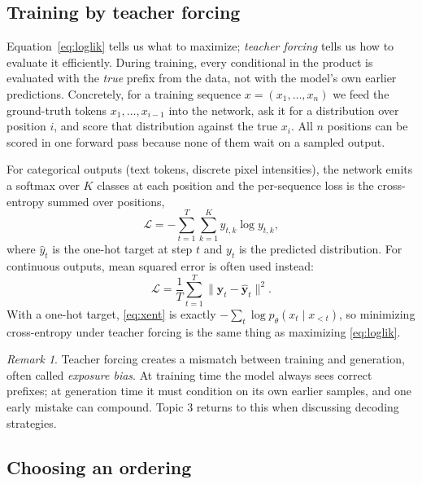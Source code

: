 \documentclass[11pt]{article}
\theoremstyle{remark}
\newtheorem*{remark}{Remark}
\begin{document}
\subsection{Training by teacher forcing}

Equation~\eqref{eq:loglik} tells us what to maximize; \emph{teacher forcing} tells us how to evaluate it efficiently. During training, every conditional in the product is evaluated with the \emph{true} prefix from the data, not with the model's own earlier predictions. Concretely, for a training sequence $x = (x_1, \dots, x_n)$ we feed the ground-truth tokens $x_1, \dots, x_{i-1}$ into the network, ask it for a distribution over position $i$, and score that distribution against the true $x_i$. All $n$ positions can be scored in one forward pass because none of them wait on a sampled output.

For categorical outputs (text tokens, discrete pixel intensities), the network emits a softmax over $K$ classes at each position and the per-sequence loss is the cross-entropy summed over positions,
\begin{equation}
\mathcal{L} = -\sum_{t=1}^{T} \sum_{k=1}^{K} \hat{y}_{t,k} \log y_{t,k},
\label{eq:xent}
\end{equation}
where $\hat{y}_{t}$ is the one-hot target at step $t$ and $y_{t}$ is the predicted distribution. For continuous outputs, mean squared error is often used instead:
\begin{equation}
\mathcal{L} = \frac{1}{T}\sum_{t=1}^{T} \|\mathbf{y}_t - \hat{\mathbf{y}}_t\|^2 .
\label{eq:mse}
\end{equation}
With a one-hot target, \eqref{eq:xent} is exactly $-\sum_t \log p_\theta(x_t \mid x_{<t})$, so minimizing cross-entropy under teacher forcing is the same thing as maximizing \eqref{eq:loglik}.

\begin{remark}
Teacher forcing creates a mismatch between training and generation, often called \emph{exposure bias}. At training time the model always sees correct prefixes; at generation time it must condition on its own earlier samples, and one early mistake can compound. Topic 3 returns to this when discussing decoding strategies.
\end{remark}

\subsection{Choosing an ordering}
\end{document}
